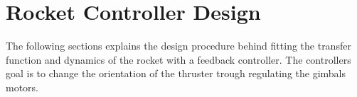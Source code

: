 \section{Rocket Controller Design}\label{sec:RocketControllerDesign}
The following sections explains the design procedure behind fitting the transfer function and dynamics of the rocket with a feedback controller. The controllers goal is to change the orientation of the thruster trough regulating the gimbals motors.    



  
